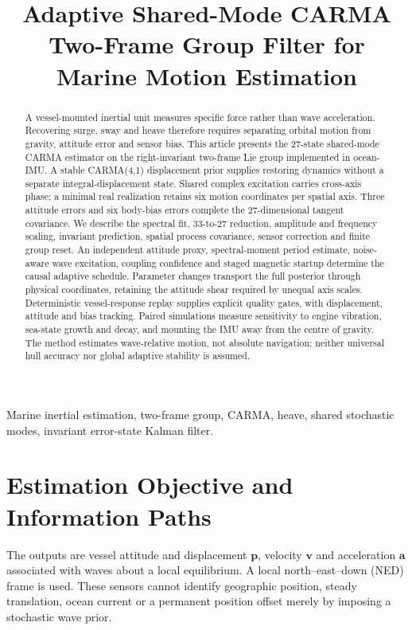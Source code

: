 \documentclass[conference]{IEEEtran}
\title{Adaptive Shared-Mode CARMA Two-Frame Group Filter for Marine Motion Estimation}
\author{\IEEEauthorblockN{Mikhail S. Grushinskiy}
\IEEEauthorblockA{Independent Researcher, Fair Lawn, NJ, USA\\
Bareboat Necessities GitHub Project\\mgrouch@users.github.com}}
\newcommand{\vc}[1]{\bm{#1}}
\begin{document}
\maketitle
\begin{abstract}
A vessel-mounted inertial unit measures specific force rather than wave
acceleration. Recovering surge, sway and heave therefore requires separating
orbital motion from gravity, attitude error and sensor bias. This article
presents the 27-state shared-mode CARMA estimator on the
right-invariant two-frame Lie group implemented in ocean-IMU. A stable
CARMA(4,1) displacement prior supplies restoring dynamics without a separate
integral-displacement state. Shared complex excitation carries
cross-axis phase; a minimal real realization retains six motion coordinates
per spatial axis. Three attitude errors and six body-bias errors complete
the 27-dimensional tangent covariance. We describe the spectral fit,
33-to-27 reduction, amplitude and frequency scaling, invariant prediction,
spatial process covariance, sensor correction and finite group reset.
An independent attitude proxy, spectral-moment period estimate, noise-aware
wave excitation, coupling confidence and staged magnetic startup determine
the causal adaptive schedule. Parameter changes transport the full posterior
through physical coordinates, retaining the attitude shear required by
unequal axis scales. Deterministic vessel-response replay supplies explicit
quality gates, with displacement, attitude and bias tracking. Paired simulations measure sensitivity to engine vibration, sea-state
growth and decay, and mounting the IMU away from the centre of gravity.
The method estimates wave-relative motion, not absolute navigation; neither
universal hull accuracy nor global adaptive stability is assumed.
\end{abstract}
\begin{IEEEkeywords}
Marine inertial estimation, two-frame group, CARMA, heave, shared stochastic
modes, invariant error-state Kalman filter.
\end{IEEEkeywords}

\section{Estimation Objective and Information Paths}
\label{sec:objective}
The outputs are vessel attitude and displacement $\vc p$, velocity $\vc v$
and acceleration $\vc a$ associated with waves about a local equilibrium.
A local north--east--down (NED) frame is used. These sensors cannot identify
geographic position, steady translation, ocean current or a permanent
position offset merely by imposing a stochastic wave prior.
\end{document}
